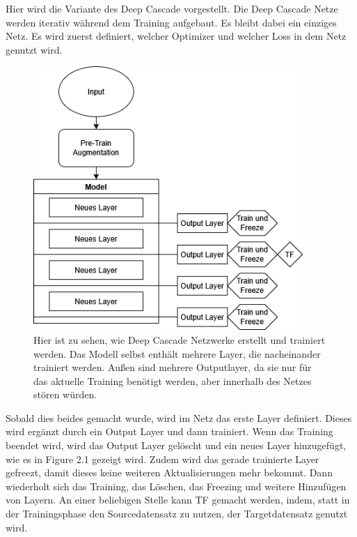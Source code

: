 Hier wird die Variante des Deep Cascade vorgestellt. 
Die Deep Cascade Netze werden iterativ während dem Training aufgebaut. Es bleibt dabei ein einziges Netz. Es wird zuerst 
definiert, welcher Optimizer und welcher Loss in dem Netz genutzt wird. 

\begin{figure}[htpb]
    \centering
    \includegraphics[height=10cm]{../../Graphiken/deepcascade_2.png}
    \caption{\label{fig:deepcascade} 
    \small{Hier ist zu sehen, wie Deep Cascade Netzwerke erstellt und trainiert werden. Das Modell selbst enthält mehrere Layer, 
    die nacheinander trainiert werden. Außen sind mehrere Outputlayer, da sie nur für das aktuelle Training benötigt werden, aber 
    innerhalb des Netzes stören würden.}}
\end{figure}

Sobald dies beides gemacht wurde, wird im Netz das erste Layer definiert. Dieses wird ergänzt durch ein Output Layer und dann trainiert. 
Wenn das Training beendet wird, wird das Output Layer gelöscht und ein neues Layer hinzugefügt, wie es in Figure 2.1 gezeigt wird. Zudem wird 
das gerade trainierte Layer gefreezt, damit dieses keine weiteren Aktualisierungen mehr bekommt. 
Dann wiederholt sich das Training, das Löschen, das Freezing und weitere Hinzufügen von Layern. 
An einer beliebigen Stelle kann TF gemacht werden, indem, statt in der Trainingsphase den Sourcedatensatz zu nutzen, der Targetdatensatz 
genutzt wird. 

